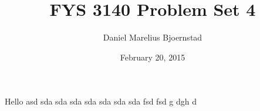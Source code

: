 \documentclass[twocolumn]{article}
\title {FYS 3140 Problem Set 4}
\author{Daniel Marelius Bjoernstad }
\date{February 20, 2015}
\begin{document}
Hello
asd
sda
sda
sda
sda
sda
sda
sda
fsd
fsd
g
dgh
d
\end{document}
